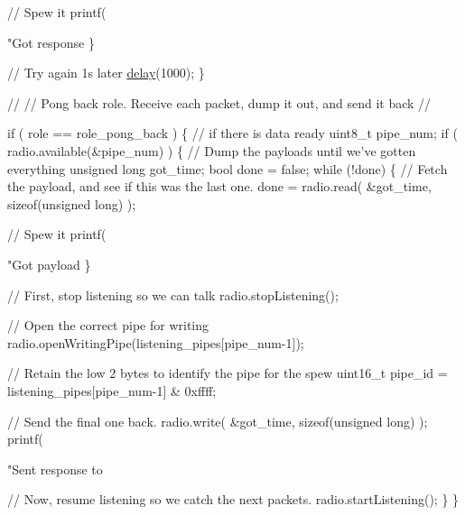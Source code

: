 \begin{DoxyCodeInclude}
{{{      \textcolor{comment}{// Spew it}
      printf(\textcolor{stringliteral}{"Got response %
    \}

    \textcolor{comment}{// Try again 1s later}
    \hyperlink{group__Porting__General_ga70a331e8ddf9acf9d33c47b71cda4c5f}{delay}(1000);
  \}

  \textcolor{comment}{//}
  \textcolor{comment}{// Pong back role.  Receive each packet, dump it out, and send it back}
  \textcolor{comment}{//}

  \textcolor{keywordflow}{if} ( role == role\_pong\_back )
  \{
    \textcolor{comment}{// if there is data ready}
    uint8\_t pipe\_num;
    \textcolor{keywordflow}{if} ( radio.available(&pipe\_num) )
    \{
      \textcolor{comment}{// Dump the payloads until we've gotten everything}
      \textcolor{keywordtype}{unsigned} \textcolor{keywordtype}{long} got\_time;
      \textcolor{keywordtype}{bool} done = \textcolor{keyword}{false};
      \textcolor{keywordflow}{while} (!done)
      \{
        \textcolor{comment}{// Fetch the payload, and see if this was the last one.}
        done = radio.read( &got\_time, \textcolor{keyword}{sizeof}(\textcolor{keywordtype}{unsigned} \textcolor{keywordtype}{long}) );

        \textcolor{comment}{// Spew it}
        printf(\textcolor{stringliteral}{"Got payload %
      \}

      \textcolor{comment}{// First, stop listening so we can talk}
      radio.stopListening();

      \textcolor{comment}{// Open the correct pipe for writing}
      radio.openWritingPipe(listening\_pipes[pipe\_num-1]);

      \textcolor{comment}{// Retain the low 2 bytes to identify the pipe for the spew}
      uint16\_t pipe\_id = listening\_pipes[pipe\_num-1] & 0xffff;

      \textcolor{comment}{// Send the final one back.}
      radio.write( &got\_time, \textcolor{keyword}{sizeof}(\textcolor{keywordtype}{unsigned} \textcolor{keywordtype}{long}) );
      printf(\textcolor{stringliteral}{"Sent response to %

      \textcolor{comment}{// Now, resume listening so we catch the next packets.}
      radio.startListening();
    \}
  \}

}}}}}}
\end{DoxyCodeInclude}
